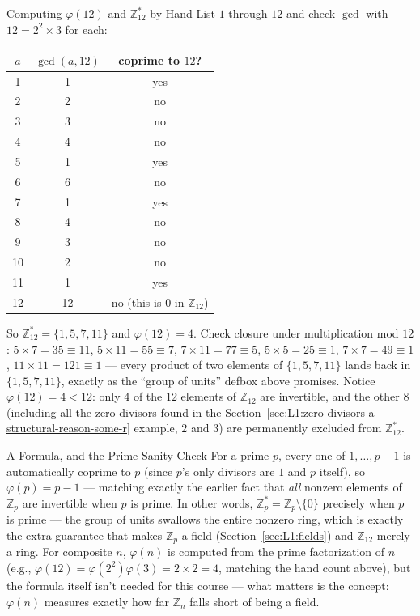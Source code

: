 \begin{exbox}{Computing $\varphi(12)$ and $\mathbb{Z}_{12}^*$ by Hand}
List $1$ through $12$ and check $\gcd$ with $12 = 2^2\times 3$ for each:
\begin{center}
\begin{tabular}{c|c|c}
$a$ & $\gcd(a,12)$ & coprime to $12$? \\
\hline
1 & 1 & yes \\
2 & 2 & no \\
3 & 3 & no \\
4 & 4 & no \\
5 & 1 & yes \\
6 & 6 & no \\
7 & 1 & yes \\
8 & 4 & no \\
9 & 3 & no \\
10 & 2 & no \\
11 & 1 & yes \\
12 & 12 & no (this is $0$ in $\mathbb{Z}_{12}$) \\
\end{tabular}
\end{center}
So $\mathbb{Z}_{12}^* = \{1,5,7,11\}$ and $\varphi(12) = 4$. Check closure under multiplication mod $12$: $5\times7=35\equiv11$, $5\times11=55\equiv7$, $7\times11=77\equiv5$, $5\times5=25\equiv1$, $7\times7=49\equiv1$, $11\times11=121\equiv1$ --- every product of two elements of $\{1,5,7,11\}$ lands back in $\{1,5,7,11\}$, exactly as the ``group of units'' defbox above promises. Notice $\varphi(12)=4 < 12$: only $4$ of the $12$ elements of $\mathbb{Z}_{12}$ are invertible, and the other $8$ (including all the zero divisors found in the Section~\ref{sec:L1:zero-divisors-a-structural-reason-some-r} example, $2$ and $3$) are permanently excluded from $\mathbb{Z}_{12}^*$.
\end{exbox}

\begin{rmkbox}{A Formula, and the Prime Sanity Check}
For a prime $p$, every one of $1,\ldots,p-1$ is automatically coprime to $p$ (since $p$'s only divisors are $1$ and $p$ itself), so $\varphi(p) = p-1$ --- matching exactly the earlier fact that \emph{all} nonzero elements of $\mathbb{Z}_p$ are invertible when $p$ is prime. In other words, $\mathbb{Z}_p^* = \mathbb{Z}_p \setminus \{0\}$ precisely when $p$ is prime --- the group of units swallows the entire nonzero ring, which is exactly the extra guarantee that makes $\mathbb{Z}_p$ a field (Section~\ref{sec:L1:fields}) and $\mathbb{Z}_{12}$ merely a ring. For composite $n$, $\varphi(n)$ is computed from the prime factorization of $n$ (e.g., $\varphi(12)=\varphi(2^2)\varphi(3)=2\times2=4$, matching the hand count above), but the formula itself isn't needed for this course --- what matters is the concept: $\varphi(n)$ measures exactly how far $\mathbb{Z}_n$ falls short of being a field.
\end{rmkbox}


